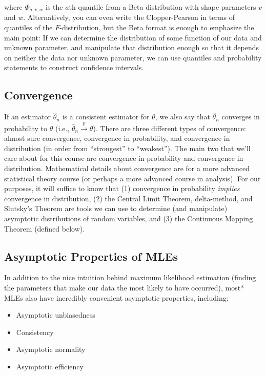 \documentclass[
  letterpaper,
  DIV=11,
  numbers=noendperiod]{scrreprt}
\begin{document}
where \(\Phi_{a; v, w}\) is the \(a\)th quantile from a Beta
distribution with shape parameters \(v\) and \(w\). Alternatively, you
can even write the Clopper-Pearson in terms of quantiles of the
\(F\)-distribution, but the Beta format is enough to emphasize the main
point: If we can determine the distribution of some function of our data
and unknown parameter, and manipulate that distribution enough so that
it depends on neither the data nor unknown parameter, we can use
quantiles and probability statements to construct confidence intervals.

\hypertarget{convergence}{%
\subsection*{Convergence}\label{convergence}}

If an estimator \(\hat{\theta}_n\) is a consistent estimator for
\(\theta\), we also say that \(\hat{\theta}_n\) converges in probability
to \(\theta\) (i.e., \(\hat{\theta}_n \overset{p}{\to} \theta\)). There
are three different types of convergence: almost sure convergence,
convergence in probability, and convergence in distribution (in order
from ``strongest'' to ``weakest''). The main two that we'll care about
for this course are convergence in probability and convergence in
distribution. Mathematical details about convergence are for a more
advanced statistical theory course (or perhaps a more advanced course in
analysis). For our purposes, it will suffice to know that (1)
convergence in probability \emph{implies} convergence in distribution,
(2) the Central Limit Theorem, delta-method, and Slutsky's Theorem are
tools we can use to determine (and manipulate) asymptotic distributions
of random variables, and (3) the Continuous Mapping Theorem (defined
below).

\hypertarget{asymptotic-properties-of-mles}{%
\subsection*{Asymptotic Properties of
MLEs}\label{asymptotic-properties-of-mles}}

In addition to the nice intuition behind maximum likelihood estimation
(finding the parameters that make our data the most likely to have
occurred), most* MLEs also have incredibly convenient asymptotic
properties, including:

\begin{itemize}
\item
  Asymptotic unbiasedness
\item
  Consistency
\item
  Asymptotic normality
\item
  Asymptotic efficiency
\end{itemize}
\end{document}
